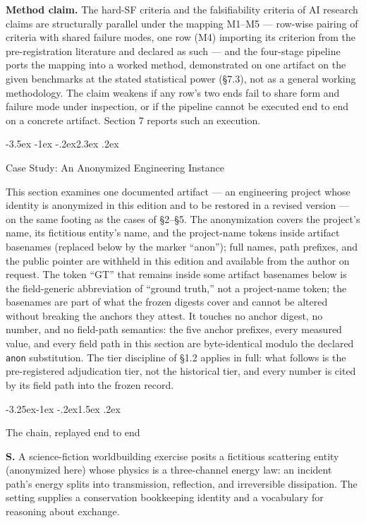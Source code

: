 \documentclass[11pt,a4paper]{article}
\makeatletter
\renewcommand\section{\@startsection{section}{1}{\z@}%
  {-3.5ex \@plus -1ex \@minus -.2ex}{2.3ex \@plus .2ex}%
  {\normalfont\Large\bfseries\raggedright}}
\renewcommand\subsection{\@startsection{subsection}{2}{\z@}%
  {-3.25ex\@plus -1ex \@minus -.2ex}{1.5ex \@plus .2ex}%
  {\normalfont\large\bfseries\raggedright}}
\makeatother
\begin{document}
\textbf{Method claim.} The hard-SF criteria and the falsifiability criteria of AI research claims are structurally parallel under the mapping M1–M5 — row-wise pairing of criteria with shared failure modes, one row (M4) importing its criterion from the pre-registration literature and declared as such — and the four-stage pipeline ports the mapping into a worked method, demonstrated on one artifact on the given benchmarks at the stated statistical power (§7.3), not as a general working methodology. The claim weakens if any row's two ends fail to share form and failure mode under inspection, or if the pipeline cannot be executed end to end on a concrete artifact. Section 7 reports such an execution.

\section{Case Study: An Anonymized Engineering Instance}

This section examines one documented artifact — an engineering project whose identity is anonymized in this edition and to be restored in a revised version — on the same footing as the cases of §2–§5. The anonymization covers the project's name, its fictitious entity's name, and the project-name tokens inside artifact basenames (replaced below by the marker ``anon''); full names, path prefixes, and the public pointer are withheld in this edition and available from the author on request. The token ``GT'' that remains inside some artifact basenames below is the field-generic abbreviation of ``ground truth,'' not a project-name token; the basenames are part of what the frozen digests cover and cannot be altered without breaking the anchors they attest. It touches no anchor digest, no number, and no field-path semantics: the five anchor prefixes, every measured value, and every field path in this section are byte-identical modulo the declared \texttt{anon} substitution. The tier discipline of §1.2 applies in full: what follows is the pre-registered adjudication tier, not the historical tier, and every number is cited by its field path into the frozen record.

\subsection{The chain, replayed end to end}

\textbf{S.} A science-fiction worldbuilding exercise posits a fictitious scattering entity (anonymized here) whose physics is a three-channel energy law: an incident path's energy splits into transmission, reflection, and irreversible dissipation. The setting supplies a conservation bookkeeping identity and a vocabulary for reasoning about exchange.
\end{document}
